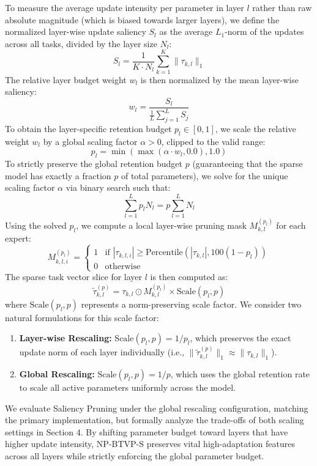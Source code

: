 To measure the average update intensity per parameter in layer $l$ rather than raw absolute magnitude (which is biased towards larger layers), we define the normalized layer-wise update saliency $S_l$ as the average $L_1$-norm of the updates across all tasks, divided by the layer size $N_l$:
\begin{equation}
S_l = \frac{1}{K \cdot N_l} \sum_{k=1}^K \|\tau_{k, l}\|_1
\end{equation}
The relative layer budget weight $w_l$ is then normalized by the mean layer-wise saliency:
\begin{equation}
w_l = \frac{S_l}{\frac{1}{L} \sum_{j=1}^L S_j}
\end{equation}
To obtain the layer-specific retention budget $p_l \in [0, 1]$, we scale the relative weight $w_l$ by a global scaling factor $\alpha > 0$, clipped to the valid range:
\begin{equation}
p_l = \min(\max(\alpha \cdot w_l, 0.0), 1.0)
\end{equation}
To strictly preserve the global retention budget $p$ (guaranteeing that the sparse model has exactly a fraction $p$ of total parameters), we solve for the unique scaling factor $\alpha$ via binary search such that:
\begin{equation}
\sum_{l=1}^L p_l N_l = p \sum_{l=1}^L N_l
\end{equation}
Using the solved $p_l$, we compute a local layer-wise pruning mask $M_{k, l}^{(p_l)}$ for each expert:
\begin{equation}
M_{k, l, i}^{(p_l)} = \begin{cases} 1 & \text{if } |\tau_{k, l, i}| \ge \text{Percentile}(|\tau_{k, l}|, 100(1-p_l)) \\ 0 & \text{otherwise} \end{cases}
\end{equation}
The sparse task vector slice for layer $l$ is then computed as:
\begin{equation}
\tilde{\tau}_{k, l}^{(p)} = \tau_{k, l} \odot M_{k, l}^{(p_l)} \times \text{Scale}(p_l, p)
\end{equation}
where $\text{Scale}(p_l, p)$ represents a norm-preserving scale factor. We consider two natural formulations for this scale factor:
\begin{enumerate}
    \item \textbf{Layer-wise Rescaling:} $\text{Scale}(p_l, p) = 1/p_l$, which preserves the exact update norm of each layer individually (i.e., $\|\tilde{\tau}_{k, l}^{(p)}\|_1 \approx \|\tau_{k, l}\|_1$).
    \item \textbf{Global Rescaling:} $\text{Scale}(p_l, p) = 1/p$, which uses the global retention rate to scale all active parameters uniformly across the model.
\end{enumerate}
We evaluate Saliency Pruning under the global rescaling configuration, matching the primary implementation, but formally analyze the trade-offs of both scaling settings in Section 4. By shifting parameter budget toward layers that have higher update intensity, NP-BTVP-S preserves vital high-adaptation features across all layers while strictly enforcing the global parameter budget.

